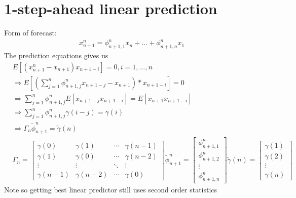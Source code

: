 \section{1-step-ahead linear prediction}
Form of forecast: 
    \begin{align*}
        x_{n+1}^n = \phi_{n+1, 1}^n x_n + ... + \phi_{n+1, n}^n x_1
    \end{align*}
The prediction equations gives us 
    \begin{align*}
        & E[(x_{n+1}^n - x_{n+1}) x_{n+1-i}] = 0, i = 1, ..., n\\
        & \Longrightarrow E[(\sum_{j=1}^n \phi_{n+1, j}^n x_{n+1-j} - x_{n+1}) * x_{n+1-i}] = 0\\
        & \Longrightarrow \sum_{j=1}^n \phi^n_{n+1, j} E[x_{n+1-j} x_{n+1-i}] = E[x_{n+1} x_{n+1-i}]\\
        & \Longrightarrow \sum_{j=1}^n \phi_{n+1,j}^n \gamma(i-j) = \gamma(i)\\
        & \Longrightarrow \Gamma_n \tilde{\phi}_{n+1}^n = \tilde{\gamma}(n) \\
        & \Gamma_n = 
            \begin{bmatrix}
            \gamma(0) & \gamma(1) & \cdots & \gamma(n-1) \\
            \gamma(1) & \gamma(0) & \cdots & \gamma(n-2) \\
            \vdots & \vdots & \ddots & \vdots \\
            \gamma(n-1) & \gamma(n-2) & \cdots & \gamma(0)
            \end{bmatrix}
        \tilde{\phi}_{n+1}^n = 
            \begin{bmatrix}
            \phi_{n+1, 1}^n \\\phi_{n+1, 2}^n \\ \vdots \\ \phi_{n+1, n}^n  
            \end{bmatrix}
        \tilde{\gamma}(n) = 
            \begin{bmatrix}
                \gamma(1) \\ \gamma(2) \\ \vdots \\ \gamma(n)
            \end{bmatrix}
    \end{align*}
Note so getting best linear predictor still uses second order statistics 


